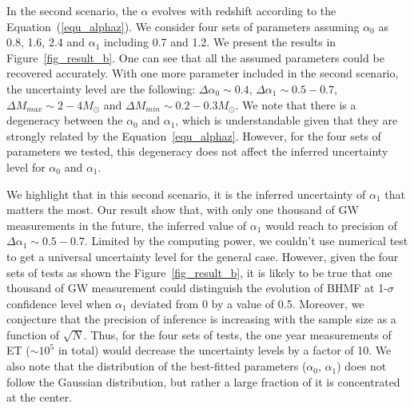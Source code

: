 \documentclass[twocolumn]{aastex62}
\begin{document}
In the second scenario, the $\alpha$ evolves with redshift according to the Equation~(\ref{equ_alphaz}). We consider four sets of parameters assuming $\alpha_0$ as  0.8, 1.6, 2.4 and $\alpha_1$ including 0.7 and 1.2. We present the results in Figure~\ref{fig_result_b}. One can see that all the assumed parameters could be recovered accurately. With one more parameter included in the second scenario, the uncertainty level are the following: $\Delta\alpha_0\sim0.4$, $\Delta\alpha_1\sim0.5-0.7$, $\Delta M_{max}\sim2-4M_{\odot}$ and $\Delta M_{min}\sim0.2-0.3M_{\odot}$. We note that there is a degeneracy between the $\alpha_0$ and $\alpha_1$, which is understandable given that they are strongly related by the Equation~\ref{equ_alphaz}. However, for the four sets of parameters we tested, this degeneracy does not affect the inferred uncertainty level for $\alpha_0$ and $\alpha_1$.

We highlight that in this second scenario, it is the inferred uncertainty of $\alpha_1$ that matters the most. Our result show that, with only one thousand of GW measurements in the future, the inferred value of $\alpha_1$ would reach to precision of $\Delta\alpha_1\sim0.5-0.7$. Limited by the computing power, we couldn't use numerical test to get a universal uncertainty level for the general case. However, given the four sets of tests as shown the Figure~\ref{fig_result_b}, it is likely to be true that one thousand of GW measurement could distinguish the evolution of BHMF at 1-$\sigma$ confidence level when $\alpha_1$ deviated from 0 by a value of 0.5. 
Moreover, we conjecture that the precision of inference is increasing with the sample size as a function of $\sqrt{N}$. Thus, for the four sets of tests, the one year measurements of ET ($\sim10^5$ in total) would decrease the uncertainty levels by a factor of 10.
We also note that the distribution of the best-fitted parameters ($\alpha_0$, $\alpha_1$) does not follow the Gaussian distribution, but rather a large fraction of it is concentrated at the center.
\end{document}
